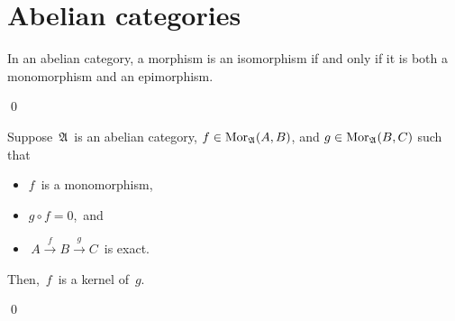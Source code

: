 

\section{Abelian categories}
\setcounter{theorem}{0}
\setcounter{equation}{0}


\renewcommand{\theenumi}{\roman{enumi}}
\renewcommand{\labelenumi}{\textnormal{(\theenumi)}$\;\;$}


\vskip 0.5cm
\begin{proposition}
\mbox{}
\vskip 0.1cm
\noindent
In an abelian category, a morphism is an isomorphism if and only if
it is both a monomorphism and an epimorphism.
\end{proposition}
\proof

\qed


\begin{proposition}\label{MonomorphicFirstFactorInExactSequenceIsKernelOfSecondFactor}
\mbox{}
\vskip 0.1cm
\noindent
Suppose \,$\mathfrak{A}$\, is an abelian category,
$f \in \textnormal{Mor}_{\mathfrak{A}}(A,B)$, and $g \in \textnormal{Mor}_{\mathfrak{A}}(B,C)$
such that
\begin{itemize}
\item
	$f$\, is a monomorphism,
\item
	$g \circ f = 0$,\, and
\item
	\,$A \overset{f}{\longrightarrow} B \overset{g}{\longrightarrow} C$\,
	is exact.
\end{itemize}
Then, \,$f$\, is a kernel of \,$g$.
\end{proposition}
\proof

\qed

